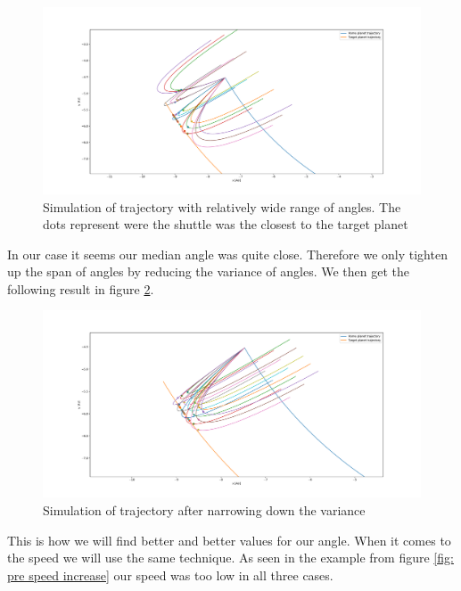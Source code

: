 \documentclass[reprint,english,notitlepage]{revtex4-2}
\begin{document}
\begin{figure}[h!]
  \centering
  \includegraphics[scale = .125]{Figures/full_angle_scatter.pdf}
  \caption{Simulation of trajectory with relatively wide range of angles. The dots represent were the shuttle was the closest to the target planet }
  \label{fig: simulation scattered}
\end{figure}
In our case it seems our median angle was quite close. Therefore we only tighten up the span of angles by reducing the variance of angles. We then get the following result in figure \ref{fig: simulation tighter}. 

\begin{figure}[h!]
  \centering
  \includegraphics[scale = .125]{Figures/narrowing_down_angle.pdf}
  \caption{Simulation of trajectory after narrowing down the variance}
  \label{fig: simulation tighter}
\end{figure}

This is how we will find better and better values for our angle. When it comes to the speed we will use the same technique. As seen in the example from figure \ref{fig: pre speed increase} our speed was too low in all three cases. 
\end{document}
